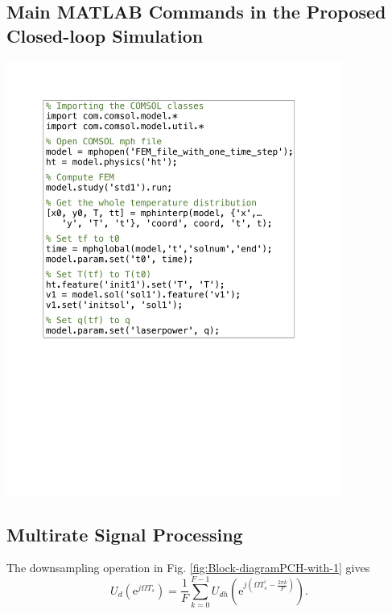 \documentclass [11pt, proquest] {uwthesis}[2020/02/24]
\begin{document}
 
\chapter{}

\section{Main MATLAB Commands in the Proposed Closed-loop Simulation} \label{chapA:MATLAB-commands-closed-loop-simulation}

\begin{center}
\includegraphics[width=11cm]{Closed-loop-simulation/pseudocode_simplified}
\par\end{center}


\section{Multirate Signal Processing} \label{secA:Multirate-Signal-Processing}

The downsampling operation in Fig. \ref{fig:Block-diagramPCH-with-1}
gives
\begin{equation}
U_{d}(\text{e}^{j\Omega T_{s}})=\frac{1}{F}\sum_{k=0}^{F-1}U_{dh}(\text{e}^{j(\Omega T_{s}^{'}-\frac{2\pi k}{F})}).\label{eq:Ud}
\end{equation}
\end{document}
